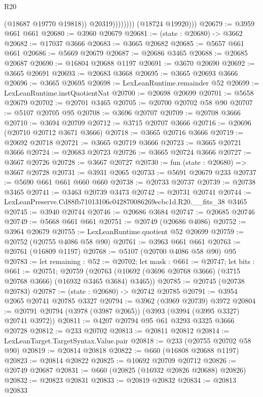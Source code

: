 \begin{lexlean}{R20}
\begin{coremodule}
                          (@18687 @19770 @19818))
                        @20319))))))))
        (@18724 @19920)))
@20679 := @3959 @661 @661
@20680 := @3960 @20679
@20681 := (state : @20680) -> @3662
@20682 := @17037 @3666
@20683 := @3665 @20682
@20685 := @5657 @661 @661
@20686 := @5669 @20679
@20687 := @20686 @3465
@20688 := @20685 @20687
@20690 := @16804 @20688 @1197
@20691 := @3670 @20690
@20692 := @3665 @20691
@20693 := @20683 @3668
@20695 := @3665 @20693 @3666
@20696 := @3665 @20695
@20698 := LexLeanRuntime.remainder @52
@20699 := LexLeanRuntime.instQuotientNat
@20700 := @20698 @20699
@20701 := @5658 @20679
@20702 := @20701 @3465
@20705 := @20700 @20702 @58 @90
@20707 := @5107 @20705 @95
@20708 := @3696 @20707
@20709 := @20708 @3666
@20710 := @3694 @20709
@20712 := @3715 @20707 @3666
@20716 := @20696 (@20710 @20712 @3671 @3666)
@20718 := @3665 @20716 @3666
@20719 := @20692 @20718
@20721 := @3665 @20719 @3666
@20723 := @3665 @20721 @3666
@20724 := @20683 @20723
@20726 := @3665 @20724 @3666
@20727 := @3667 @20726
@20728 := @3667 @20727
@20730 := fun (state : @20680) => @3667 @20728
@20731 := @3931 @2065
@20733 := @5691 @20679 @233
@20737 := @5690 @661 @661 @660 @660
@20738 := @20733 @20737
@20739 := @20738 @3465
@20741 := @3463 @20739 @3473
@20742 := @20731 @20741
@20744 := LexLeanPreserve.Cd88fb71013106c042870086269ecbc1d.R20.__fits_38 @3465
@20745 := @3940 @20744
@20746 := @20686 @3684
@20747 := @20685 @20746
@20749 := @5668 @661 @661
@20751 := @20749 (@20686 @4086)
@20752 := @3964 @20679
@20755 := LexLeanRuntime.quotient @52 @20699
@20759 := @20752 (@20755 @4086 @58 @90)
@20761 := @3963 @661 @661
@20763 := @20761 (@16809 @1197)
@20768 := @5107 (@20700 @4086 @58 @90) @95
@20783 := let remaining : @52 := @20702;
  let mask : @661 := @20747;
  let bits : @661 := @20751;
  @20759 (@20763 (@10692 (@3696 @20768 @3666) (@3715 @20768 @3666) (@16932 @3465 @3684) @3465))
@20785 := @20745 (@20738 @20783)
@20787 := (state : @20680) -> @20742 @20785
@20791 := @3954 @2065 @20741 @20785 @3327
@20794 := @3962 (@3969 @20739) @3972
@20804 := @20791 @20794 (@3978 (@3987 @2065)) (@3993 (@3994 (@3995 @3327) @20741 @3972))
@20811 := @4207 @20794 @95 @61 @3293 @3325 @3666 @20728
@20812 := @233 @20702
@20813 := @20811 @20812
@20814 := LexLeanTarget.TargetSyntax.Value.pair
@20818 := @233 (@20755 @20702 @58 @90)
@20819 := @20814 @20818
@20822 := @660 (@16808 @20688 @1197)
@20823 := @20814 @20822
@20825 := @10692 @20709 @20712
@20826 := @20749 @20687
@20831 := @660 (@20825 (@16932 @20826 @20688) @20826)
@20832 := @20823 @20831
@20833 := @20819 @20832
@20834 := @20813 @20833

\end{coremodule}
\end{lexlean}
